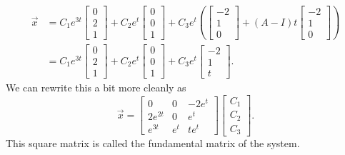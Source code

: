 \begin{align*}
	\vec{x} &= C_1e^{3t}\begin{bmatrix}
		0 \\
		2 \\
		1
	\end{bmatrix} + C_2e^{t}\begin{bmatrix}
		0 \\
		0 \\
		1
	\end{bmatrix} + C_3e^{t}\left(\begin{bmatrix}
		-2 \\
		1 \\
		0
	\end{bmatrix} + (A - I)t\begin{bmatrix}
		-2 \\
		1 \\
		0
	\end{bmatrix}\right) \\
	&= C_1e^{3t}\begin{bmatrix}
		0 \\
		2 \\
		1
	\end{bmatrix} + C_2e^{t}\begin{bmatrix}
		0 \\
		0 \\
		1
	\end{bmatrix} + C_3e^{t}\begin{bmatrix}
		-2 \\
		1 \\
		t
	\end{bmatrix}.
\end{align*}
We can rewrite this a bit more cleanly as
\begin{equation*}
	\vec{x} = \begin{bmatrix}
		0 & 0 & -2e^t \\
		2e^{2t} & 0 & e^t \\
		e^{3t} & e^t & te^t
	\end{bmatrix} \begin{bmatrix}
		C_1 \\
		C_2 \\
		C_3
	\end{bmatrix}.
\end{equation*}
This square matrix is called the fundamental matrix of the system.